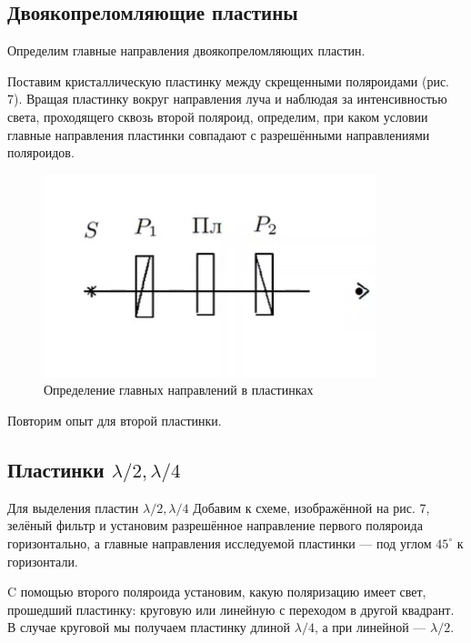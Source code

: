\documentclass[a4paper,12pt]{article}
\begin{document}
\subsection{Двоякопреломляющие пластины}

Определим главные направления двоякопреломляющих пластин. 

Поставим кристаллическую пластинку между скрещенными поляроидами (рис. 7). Вращая пластинку вокруг направления луча и наблюдая за интенсивностью света, проходящего сквозь второй поляроид, определим, при каком условии главные направления пластинки совпадают с разрешёнными направлениями поляроидов. 

\begin{figure}
	\includegraphics[width=\linewidth]{7}
	\caption{Определение главных
		направлений в пластинках}
	\label{ris 7}
\end{figure}

Повторим опыт для второй пластинки.

\subsection{Пластинки $ \lambda/2, \lambda/4 $}

Для выделения пластин $ \lambda/2, \lambda/4 $ Добавим к схеме, изображённой на рис. 7, зелёный фильтр и установим разрешённое направление первого поляроида горизонтально, а главные направления исследуемой пластинки --- под углом $ 45^\circ $ к горизонтали.

C помощью второго поляроида установим, какую поляризацию
имеет свет, прошедший пластинку: круговую или линейную с переходом
в другой квадрант. В случае круговой мы получаем пластинку длиной $ \lambda/4 $, а при линейной --- $ \lambda/2 $.
\end{document}
